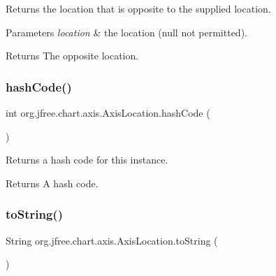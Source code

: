 Returns the location that is opposite to the supplied location.


\begin{DoxyParams}{Parameters}
{\em location} & the location ({\ttfamily null} not permitted).\\
\hline
\end{DoxyParams}
\begin{DoxyReturn}{Returns}
The opposite location. 
\end{DoxyReturn}
\mbox{\label{classorg_1_1jfree_1_1chart_1_1axis_1_1_axis_location_a25946032616bf206f21677db4fe28d8f}} 
\subsubsection{\texorpdfstring{hash\+Code()}{hashCode()}}
{\footnotesize\ttfamily int org.\+jfree.\+chart.\+axis.\+Axis\+Location.\+hash\+Code (\begin{DoxyParamCaption}{ }\end{DoxyParamCaption})}

Returns a hash code for this instance.

\begin{DoxyReturn}{Returns}
A hash code. 
\end{DoxyReturn}
\mbox{\label{classorg_1_1jfree_1_1chart_1_1axis_1_1_axis_location_a805f57ad4431115e866583d9af029f15}} 
\subsubsection{\texorpdfstring{to\+String()}{toString()}}
{\footnotesize\ttfamily String org.\+jfree.\+chart.\+axis.\+Axis\+Location.\+to\+String (\begin{DoxyParamCaption}{ }\end{DoxyParamCaption})}

